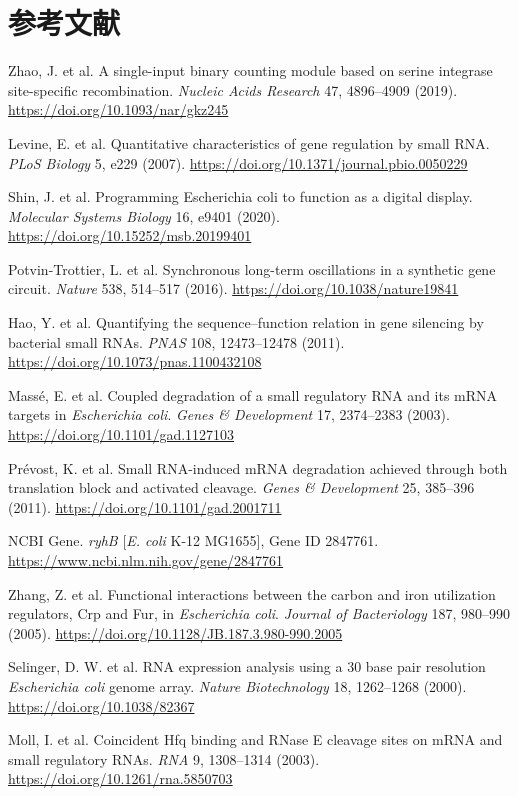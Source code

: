 \documentclass[UTF8,a4paper,11pt,fontset=windows]{ctexart}
\begin{document}
\section*{参考文献}
\begin{enumerate}[label={[\arabic*]}]
\item Zhao, J. et al. A single-input binary counting module based on serine integrase site-specific recombination. \textit{Nucleic Acids Research} 47, 4896--4909 (2019). \url{https://doi.org/10.1093/nar/gkz245}
\item Levine, E. et al. Quantitative characteristics of gene regulation by small RNA. \textit{PLoS Biology} 5, e229 (2007). \url{https://doi.org/10.1371/journal.pbio.0050229}
\item Shin, J. et al. Programming Escherichia coli to function as a digital display. \textit{Molecular Systems Biology} 16, e9401 (2020). \url{https://doi.org/10.15252/msb.20199401}
\item Potvin-Trottier, L. et al. Synchronous long-term oscillations in a synthetic gene circuit. \textit{Nature} 538, 514--517 (2016). \url{https://doi.org/10.1038/nature19841}
\item Hao, Y. et al. Quantifying the sequence--function relation in gene silencing by bacterial small RNAs. \textit{PNAS} 108, 12473--12478 (2011). \url{https://doi.org/10.1073/pnas.1100432108}
\item Massé, E. et al. Coupled degradation of a small regulatory RNA and its mRNA targets in \textit{Escherichia coli}. \textit{Genes \& Development} 17, 2374--2383 (2003). \url{https://doi.org/10.1101/gad.1127103}
\item Prévost, K. et al. Small RNA-induced mRNA degradation achieved through both translation block and activated cleavage. \textit{Genes \& Development} 25, 385--396 (2011). \url{https://doi.org/10.1101/gad.2001711}
\item NCBI Gene. \textit{ryhB} [\textit{E. coli} K-12 MG1655], Gene ID 2847761. \url{https://www.ncbi.nlm.nih.gov/gene/2847761}
\item Zhang, Z. et al. Functional interactions between the carbon and iron utilization regulators, Crp and Fur, in \textit{Escherichia coli}. \textit{Journal of Bacteriology} 187, 980--990 (2005). \url{https://doi.org/10.1128/JB.187.3.980-990.2005}
\item Selinger, D. W. et al. RNA expression analysis using a 30 base pair resolution \textit{Escherichia coli} genome array. \textit{Nature Biotechnology} 18, 1262--1268 (2000). \url{https://doi.org/10.1038/82367}
\item Moll, I. et al. Coincident Hfq binding and RNase E cleavage sites on mRNA and small regulatory RNAs. \textit{RNA} 9, 1308--1314 (2003). \url{https://doi.org/10.1261/rna.5850703}
\end{enumerate}
\end{document}
